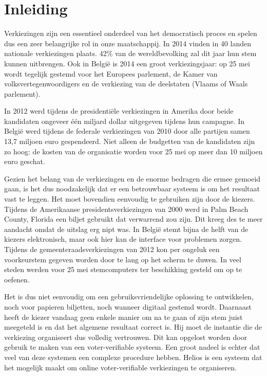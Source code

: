 % 
%

\chapter{Inleiding}
\label{chap:inleiding}

Verkiezingen zijn een essentieel onderdeel van het democratisch proces en spelen dus een zeer belangrijke rol in onze maatschappij. In 2014 vinden in 40 landen nationale verkiezingen plaats. 42\% van de wereldbevolking zal dit jaar hun stem kunnen uitbrengen.\cite{news:economist_2014_ballot_boxes} Ook in Belgi\"e is 2014 een groot verkiezingsjaar: op 25 mei wordt tegelijk gestemd voor het Europees parlement, de Kamer van volksvertegenwoordigers en de verkiezing van de deelstaten (Vlaams of Waals parlement).

\npar In 2012 werd tijdens de presidenti\"ele verkiezingen in Amerika door beide kandidaten ongeveer \'e\'en miljard dollar uitgegeven tijdens hun campagne.\cite{news:nytimes_2012_money_race} In Belgi\"e werd tijdens de federale verkiezingen van 2010 door alle partijen samen 13,7 miljoen euro gespendeerd. Niet alleen de budgetten van de kandidaten zijn zo hoog: de kosten van de organisatie worden voor 25 mei op meer dan 10 miljoen euro geschat.\cite{news:tijd_moeder_aller_verkiezingen_kostprijs}

\npar Gezien het belang van de verkiezingen en de enorme bedragen die ermee gemoeid gaan, is het dus noodzakelijk dat er een betrouwbaar systeem is om het resultaat vast te leggen. Het moet bovendien eenvoudig te gebruiken zijn door de kiezers. Tijdens de Amerikaanse presidentsverkiezingen van 2000 werd in Palm Beach County, Florida een biljet gebruikt dat verwarrend zou zijn. Dit kreeg des te meer aandacht omdat de uitslag erg nipt was.\cite{wiki:united_states_presidential_election_in_florida_2000} In Belgi\"e stemt bijna de helft van de kiezers elektronisch, maar ook hier kan de interface voor problemen zorgen. Tijdens de gemeenteraadsverkiezingen van 2012 kon per ongeluk een voorkeurstem gegeven worden door te lang op het scherm te duwen.\cite{news:maddens_zijn_de_stemcomputers_wel_te_vertrouwen} In veel steden werden voor 25 mei stemcomputers ter beschikking gesteld om op te oefenen.\cite{news:de_redactie_ga_eens_oefenen_op_een_stemcomputer}

\npar Het is dus niet eenvoudig om een gebruiksvriendelijke oplossing te ontwikkelen, noch voor papieren biljetten, noch wanneer digitaal gestemd wordt. Daarnaast heeft de kiezer vandaag geen enkele manier om na te gaan of zijn stem juist meegeteld is en dat het algemene resultaat correct is. Hij moet de instantie die de verkiezing organiseert dus volledig vertrouwen. Dit kan opgelost worden door gebruik te maken van een voter-verifiable systeem. Een groot nadeel is echter dat veel van deze systemen een complexe procedure hebben. Helios is een systeem dat het mogelijk maakt om online voter-verifiable verkiezingen te organiseren.

